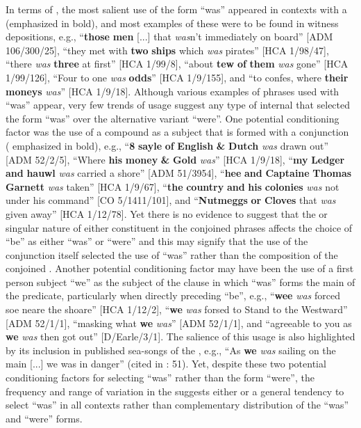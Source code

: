 In terms of , the most salient use of the  form “was” appeared in   contexts with a  (emphasized in bold), and most examples of these were to be found in witness depositions, e.g., “\textbf{those} \textbf{men} [...] that \textit{was}n't immediately on board” [ADM 106/300/25], “they met with \textbf{two} \textbf{ships} which \textit{was} pirates” [HCA 1/98/47], “there \textit{was} \textbf{three} at first” [HCA 1/99/8], “about \textbf{tew} \textbf{of} \textbf{them} \textit{was} gone” [HCA 1/99/126], “Four to one \textit{was} \textbf{odds}” [HCA 1/9/155], and “to confes, where \textbf{their} \textbf{moneys} \textit{was}” [HCA 1/9/18]. Although various examples of    phrases used with “was” appear, very few trends of usage suggest any type of internal  that selected the  form “was” over the alternative variant “were”.  One potential conditioning factor was the use of a compound  as a subject that is formed with a conjunction ( emphasized in bold), e.g., “\textbf{8} \textbf{sayle} \textbf{of} \textbf{English} \textbf{\&}  \textbf{Dutch} \textit{was} drawn out” [ADM 52/2/5], “Where \textbf{his} \textbf{money} \textbf{\&}  \textbf{Gold} \textit{was}” [HCA 1/9/18], “\textbf{my} \textbf{Ledger} \textbf{and} \textbf{hauwl} \textit{was} carried a shore” [ADM 51/3954], “\textbf{hee} \textbf{and} \textbf{Captaine} \textbf{Thomas} \textbf{Garnett} \textit{was} taken” [HCA 1/9/67], “\textbf{the} \textbf{country} \textbf{and} \textbf{his} \textbf{colonies} \textit{was} not under his command” [CO 5/1411/101], and “\textbf{Nutmeggs} \textbf{or} \textbf{Cloves} that \textit{was} given away” [HCA 1/12/78]. Yet there is no evidence to suggest that the  or singular nature of either constituent in the conjoined  phrases affects the choice of “be”  as either “was” or “were” and this may signify that the use of the conjunction itself selected the use of “was” rather than the composition of the conjoined . Another potential conditioning factor may have been the use of a first person   subject “we” as the subject of the clause in which “was” forms the main  of the predicate, particularly when directly preceding “be”, e.g., “\textbf{wee} \textit{was} forced soe neare the shoare” [HCA 1/12/2], “\textbf{we} \textit{was} forsed to Stand to the Westward” [ADM 52/1/1], “masking what \textbf{we} \textit{was}” [ADM 52/1/1], and “agreeable to you as \textbf{we} \textit{was} then got out” [D/Earle/3/1]. The salience of this usage is also highlighted by its inclusion in published sea-songs of the , e.g., “As \textbf{we} \textit{was} sailing on the main [...] we was in danger” (cited in \citealt{Palmer1986}: 51). Yet, despite these two potential conditioning factors for selecting “was” rather than the  form “were”, the frequency and range of variation in the  suggests either  or a general tendency to select “was” in all contexts rather than complementary distribution of the “was” and “were” forms. 

